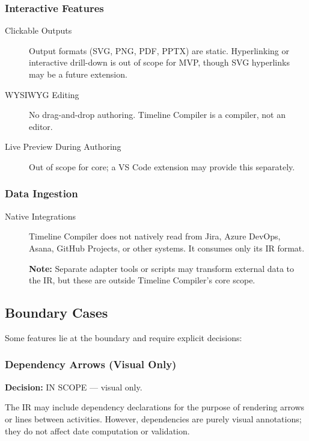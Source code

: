 \subsubsection{Interactive Features}

\begin{description}
  \item[Clickable Outputs] Output formats (SVG, PNG, PDF, PPTX) are static. Hyperlinking or interactive drill-down is out of scope for MVP, though SVG hyperlinks may be a future extension.
  
  \item[WYSIWYG Editing] No drag-and-drop authoring. Timeline Compiler is a compiler, not an editor.
  
  \item[Live Preview During Authoring] Out of scope for core; a VS Code extension may provide this separately.
\end{description}

\subsubsection{Data Ingestion}

\begin{description}
  \item[Native Integrations] Timeline Compiler does not natively read from Jira, Azure DevOps, Asana, GitHub Projects, or other systems. It consumes only its IR format.
  
  \textbf{Note:} Separate adapter tools or scripts may transform external data to the IR, but these are outside Timeline Compiler's core scope.
\end{description}

\subsection{Boundary Cases}

Some features lie at the boundary and require explicit decisions:

\subsubsection{Dependency Arrows (Visual Only)}

\textbf{Decision:} IN SCOPE — visual only.

The IR may include dependency declarations for the purpose of rendering arrows or lines between activities. However, dependencies are purely visual annotations; they do not affect date computation or validation.

